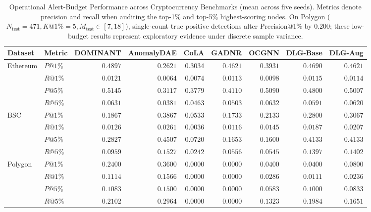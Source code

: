 \documentclass[11pt,a4paper]{article}
\begin{document}
\begin{table}[htbp]
\centering\small\setlength{\tabcolsep}{3.5pt}
\caption{Operational Alert-Budget Performance across Cryptocurrency Benchmarks (mean across five seeds). Metrics denote precision and recall when auditing the top-1\% and top-5\% highest-scoring nodes. On Polygon ($N_{\mathrm{test}}=471, K@1\%=5, M_{\mathrm{test}} \in [7, 18]$), single-count true positive detections alter Precision@1\% by $0.200$; these low-budget results represent exploratory evidence under discrete sample variance.}
\label{tab:alert_budget}
\begin{tabularx}{\textwidth}{llrrrrrrr}\toprule
\textbf{Dataset} & \textbf{Metric} & \textbf{DOMINANT} & \textbf{AnomalyDAE} & \textbf{CoLA} & \textbf{GADNR} & \textbf{OCGNN} & \textbf{DLG-Base} & \textbf{DLG-Aug} \\\midrule
\multirow{4}{*}{Ethereum} & $P@1\%$ & $\mathbf{0.4897}$ & $0.2621$ & $0.3034$ & $0.4621$ & $0.3931$ & $0.4690$ & $0.4621$ \\
 & $R@1\%$ & $\mathbf{0.0121}$ & $0.0064$ & $0.0074$ & $0.0113$ & $0.0098$ & $0.0115$ & $0.0114$ \\
 & $P@5\%$ & $\mathbf{0.5145}$ & $0.3117$ & $0.3779$ & $0.4110$ & $0.5090$ & $0.4800$ & $0.5007$ \\
 & $R@5\%$ & $0.0631$ & $0.0381$ & $0.0463$ & $0.0503$ & $\mathbf{0.0632}$ & $0.0591$ & $0.0620$ \\
\midrule
\multirow{4}{*}{BSC} & $P@1\%$ & $0.1867$ & $\mathbf{0.3867}$ & $0.0533$ & $0.1733$ & $0.2133$ & $0.2800$ & $0.3067$ \\
 & $R@1\%$ & $0.0126$ & $\mathbf{0.0261}$ & $0.0036$ & $0.0116$ & $0.0145$ & $0.0187$ & $0.0207$ \\
 & $P@5\%$ & $0.2827$ & $\mathbf{0.4507}$ & $0.0720$ & $0.1653$ & $0.1600$ & $0.4133$ & $0.4133$ \\
 & $R@5\%$ & $0.0959$ & $\mathbf{0.1527}$ & $0.0242$ & $0.0556$ & $0.0545$ & $0.1397$ & $0.1402$ \\
\midrule
\multirow{4}{*}{Polygon} & $P@1\%$ & $0.2400$ & $\mathbf{0.3600}$ & $0.0000$ & $0.0000$ & $0.0400$ & $0.0400$ & $0.0800$ \\
 & $R@1\%$ & $0.1114$ & $\mathbf{0.1566}$ & $0.0000$ & $0.0000$ & $0.0286$ & $0.0111$ & $0.0236$ \\
 & $P@5\%$ & $0.1083$ & $\mathbf{0.1500}$ & $0.0000$ & $0.0000$ & $0.0583$ & $0.1000$ & $0.0833$ \\
 & $R@5\%$ & $0.2102$ & $\mathbf{0.2964}$ & $0.0000$ & $0.0000$ & $0.1323$ & $0.1984$ & $0.1651$ \\
\bottomrule
\end{tabularx}
\end{table}
\end{document}
